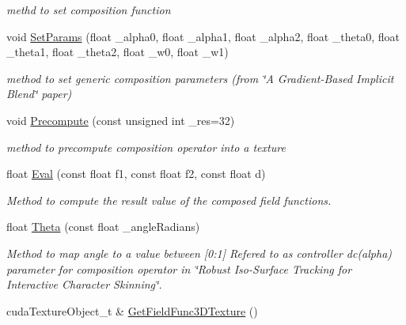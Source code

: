 \begin{DoxyCompactItemize}
\begin{DoxyCompactList}\small\item\em methd to set composition function \end{DoxyCompactList}\item 
void \hyperlink{classCompositionOp_acbc3386cd2afc194dcc621f47fca666d}{Set\+Params} (float \+\_\+alpha0, float \+\_\+alpha1, float \+\_\+alpha2, float \+\_\+theta0, float \+\_\+theta1, float \+\_\+theta2, float \+\_\+w0, float \+\_\+w1)\hypertarget{classCompositionOp_acbc3386cd2afc194dcc621f47fca666d}{}\label{classCompositionOp_acbc3386cd2afc194dcc621f47fca666d}

\begin{DoxyCompactList}\small\item\em method to set generic composition parameters (from \char`\"{}\+A Gradient-\/\+Based Implicit Blend\char`\"{} paper) \end{DoxyCompactList}\item 
void \hyperlink{classCompositionOp_aa80f5d11ae31e1f6863ad444d1f090e2}{Precompute} (const unsigned int \+\_\+res=32)
\begin{DoxyCompactList}\small\item\em method to precompute composition operator into a texture \end{DoxyCompactList}\item 
float \hyperlink{classCompositionOp_a57732ab8935cfe1be82db7185feb5ae9}{Eval} (const float f1, const float f2, const float d)\hypertarget{classCompositionOp_a57732ab8935cfe1be82db7185feb5ae9}{}\label{classCompositionOp_a57732ab8935cfe1be82db7185feb5ae9}

\begin{DoxyCompactList}\small\item\em Method to compute the result value of the composed field functions. \end{DoxyCompactList}\item 
float \hyperlink{classCompositionOp_a402a1e7857bd812c016b10b4303a0367}{Theta} (const float \+\_\+angle\+Radians)\hypertarget{classCompositionOp_a402a1e7857bd812c016b10b4303a0367}{}\label{classCompositionOp_a402a1e7857bd812c016b10b4303a0367}

\begin{DoxyCompactList}\small\item\em Method to map angle to a value between \mbox{[}0\+:1\mbox{]} Refered to as controller dc(alpha) parameter for composition operator in \char`\"{}\+Robust Iso-\/\+Surface Tracking for Interactive Character Skinning\char`\"{}. \end{DoxyCompactList}\item 
cuda\+Texture\+Object\+\_\+t \& \hyperlink{classCompositionOp_a572988818063a3b9dfdd620931be8f43}{Get\+Field\+Func3\+D\+Texture} ()\hypertarget{classCompositionOp_a572988818063a3b9dfdd620931be8f43}{}\label{classCompositionOp_a572988818063a3b9dfdd620931be8f43}


\end{DoxyCompactItemize}
